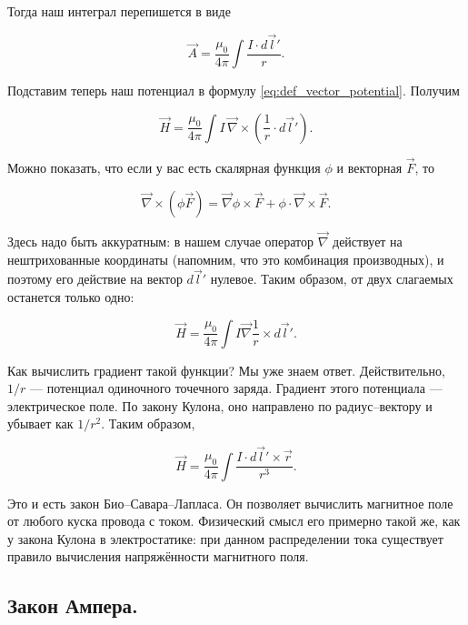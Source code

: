 \documentclass[11pt,a4paper]{article}
\numberwithin{equation}{section}
\newcommand{\vn}{\vec{\nabla}}
\begin{document}
Тогда наш интеграл перепишется в виде

\begin{equation}
  \label{eq:der_bio-savart-laplace}
  \vec{A} = \frac{\mu_0}{4\pi} \int \frac{I \cdot d\vec{l}'}{r}.
\end{equation}

Подставим теперь наш потенциал в формулу
\eqref{eq:def_vector_potential}. Получим

\begin{equation}
  \label{eq:bio-savart-laplace_1}
  \vec{H} =\frac{\mu_0}{4\pi} \int I\, \vn \times \left( \frac{1}{r} \cdot d\vec{l}' \right).
\end{equation}

Можно показать, что если у вас есть скалярная функция $\phi$ и
векторная $\vec{F}$, то

\begin{equation}
  \label{eq:rot_prop}
  \vn \times (\phi \vec{F}) = \vn \phi \times \vec{F} + \phi \cdot \vn
  \times \vec{F}.
\end{equation}

Здесь надо быть аккуратным: в нашем случае оператор $\vn$ действует на нештрихованные
координаты (напомним, что это комбинация производных), и поэтому его
действие на вектор $d\vec{l}'$ нулевое. Таким образом, от двух
слагаемых останется только одно: 

\begin{equation}
  \label{eq:der_bio-savart-laplace_2}
  \vec{H} = \frac{\mu_0}{4\pi} \int I \vn \frac{1}{r} \times d\vec{l}'.
\end{equation}

Как вычислить градиент такой функции? Мы уже знаем
ответ. Действительно, $1/r$ --- потенциал одиночного точечного
заряда. Градиент этого потенциала --- электрическое поле. По закону
Кулона, оно направлено по радиус--вектору и убывает как $1/r^2$. Таким
образом, 

\begin{equation}
  \label{eq:der_bio-savart-laplace_3}
  \vec{H} = \frac{\mu_0}{4\pi} \int \frac{I \cdot d\vec{l}' \times \vec{r}}{r^3}.
\end{equation}

Это и есть закон Био--Савара--Лапласа. Он позволяет вычислить
магнитное поле от любого куска провода с током. Физический смысл его
примерно такой же, как у закона Кулона в электростатике: при данном
распределении тока существует правило вычисления напряжённости
магнитного поля. 

\subsection{Закон Ампера.}
\label{sec:amperes_law}
\end{document}
